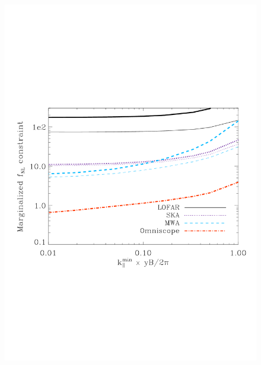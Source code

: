 \documentclass{PoS}
\begin{document}
\begin{figure}[!t]
\includegraphics[scale=0.3]{figures/figure4.pdf}

\end{figure}
\end{document}
